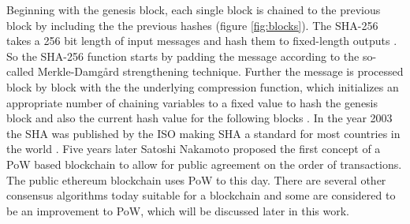 Beginning with the genesis block, each single block is chained to the previous block by including the the previous hashes (figure \ref{fig:blocks}). The \ac{SHA-256} takes a 256 bit length of input
messages and hash them to fixed-length outputs \cite{van2014encyclopedia}. So the \ac{SHA-256} function starts by padding the message according to the so-called Merkle-Damg{\aa}rd strengthening technique. Further the message is processed block by block with the the underlying compression function, which initializes an appropriate number of chaining variables to a fixed value to hash the genesis block and also the current hash value for the following blocks \cite{coron2005merkle}. In the year 2003 the \ac{SHA} was published by the \ac{ISO} making \ac{SHA} a standard for most countries in the world \cite{isoSHA-256}. Five years later Satoshi Nakamoto proposed the first concept of a \ac{PoW} based blockchain to allow for public agreement on the order of transactions. The public ethereum blockchain uses \ac{PoW} to this day. There are several other consensus algorithms today suitable for a blockchain and some are considered to be an improvement to \ac{PoW}, which will be discussed later in this work.

\clearpage

